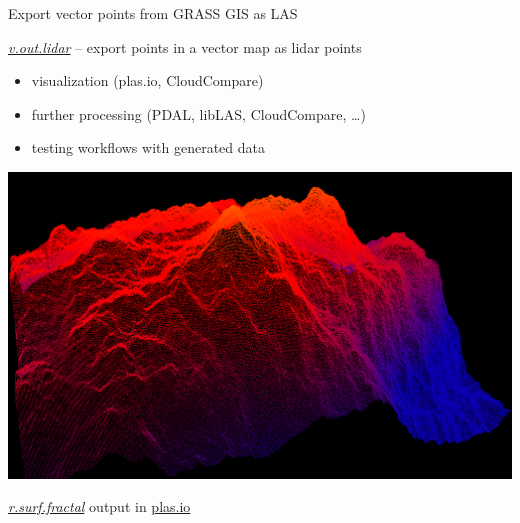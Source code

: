 \documentclass[xcolor={dvipsnames,usenames},beamer,aspectratio=1610]{beamer}
\newcommand{\gmodule}[1]{\href{http://grass.osgeo.org/grass71/manuals/#1.html}{\emph{#1}}}
\newcommand{\module}[1]{\emph{#1}}
\begin{document}
\begin{frame}{Export vector points from GRASS GIS as LAS}

\gmodule{v.out.lidar} -- export points in a vector map as lidar points

\begin{itemize}
\item visualization (plas.io, CloudCompare)
\item further processing (PDAL, libLAS, CloudCompare, \ldots)
\item testing workflows with generated data
\end{itemize}

\begin{center}
\includegraphics[height=0.5\textheight]{images/features/fractals_plasio}

\gmodule{r.surf.fractal} output in \href{http://plas.io}{plas.io}
\end{center}


\end{frame}



\end{document}
